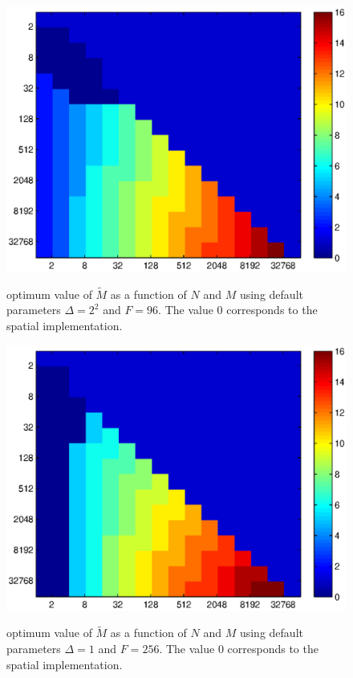 \documentclass{article}
\begin{document}
\begin{figure}[h]
\caption{optimum value of $\tilde{M}$ as a function of $N$ and $M$ 
using default parameters $\Delta=2^2$ and $F=96$. The value $0$ 
corresponds to the spatial implementation.} 
\includegraphics[scale=0.6]{img/fftconvanalysis1.eps}
\label{fftfig}
\end{figure}

\begin{figure}[h]
\caption{optimum value of $\tilde{M}$ as a function of $N$ and $M$ 
using default parameters $\Delta=1$ and $F=256$. The value $0$ 
corresponds to the spatial implementation.} 
\includegraphics[scale=0.6]{img/fftconvanalysis2.eps}
\label{fftfig}
\end{figure}
\end{document}
